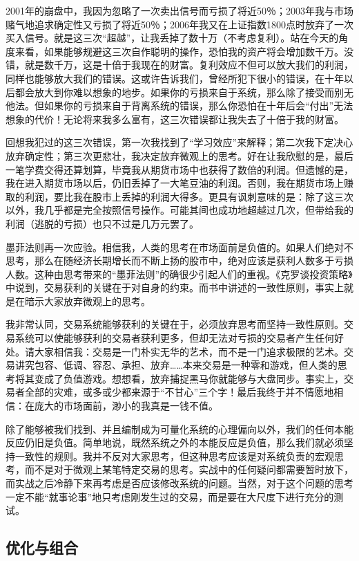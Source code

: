 2001年的崩盘中，我因为忽略了一次卖出信号而亏损了将近50％；2003年我与市场赌气地追求确定性又亏损了将近50％；2006年我又在上证指数1800点时放弃了一次买入信号。就是这三次“超越”，让我丢掉了数十万（不考虑复利）。站在今天的角度来看，如果能够规避这三次自作聪明的操作，恐怕我的资产将会增加数千万。没错，就是数千万，这是十倍于我现在的财富。复利效应不但可以放大我们的利润，同样也能够放大我们的错误。这或许告诉我们，曾经所犯下很小的错误，在十年以后都会放大到你难以想象的地步。如果你的亏损来自于系统，那么除了接受而别无他法。但如果你的亏损来自于背离系统的错误，那么你恐怕在十年后会“付出”无法想象的代价！无论将来我多么富有，这三次错误都让我失去了十倍于我的财富。

回想我犯过的这三次错误，第一次我找到了“学习效应”来解释；第二次我下定决心放弃确定性；第三次更悲壮，我决定放弃微观上的思考。好在让我欣慰的是，最后一笔学费交得还算划算，毕竟我从期货市场中也获得了数倍的利润。但遗憾的是，我在进入期货市场以后，仍旧丢掉了一大笔豆油的利润。否则，我在期货市场上赚取的利润，要比我在股市上丢掉的利润大得多。更具有讽刺意味的是：除了这三次以外，我几乎都是完全按照信号操作。可能其间也成功地超越过几次，但带给我的利润（逃脱的亏损）也只不过是几万元罢了。

墨菲法则再一次应验。相信我，人类的思考在市场面前是负值的。如果人们绝对不思考，那么在随经济长期增长而不断上扬的股市中，绝对应该是获利人数多于亏损人数。这种由思考带来的“墨菲法则”的确很少引起人们的重视。《克罗谈投资策略》中说到，交易获利的关键在于对自身的约束。而书中讲述的一致性原则，事实上就是在暗示大家放弃微观上的思考。

我非常认同，交易系统能够获利的关键在于，必须放弃思考而坚持一致性原则。交易系统可以使能够获利的交易者获利更多，但却无法对亏损的交易者产生任何好处。请大家相信我：交易是一门朴实无华的艺术，而不是一门追求极限的艺术。交易讲究包容、低调、容忍、承担、放弃……本来交易是一种零和游戏，但人类的思考将其变成了负值游戏。想想看，放弃捕捉黑马你就能够与大盘同步。事实上，交易者全部的灾难，或多或少都来源于“不甘心”三个字！最后我终于并不情愿地相信：在庞大的市场面前，渺小的我真是一钱不值。

除了能够被我们找到、并且编制成为可量化系统的心理偏向以外，我们的任何本能反应仍旧是负值。简单地说，既然系统之外的本能反应是负值，那么我们就必须坚持一致性的规则。我并不反对大家思考，但这种思考应该是对系统负责的宏观思考，而不是对于微观上某笔特定交易的思考。实战中的任何疑问都需要暂时放下，而实战之后冷静下来再考虑是否应该修改系统的问题。当然，对于这个问题的思考一定不能“就事论事”地只考虑刚发生过的交易，而是要在大尺度下进行充分的测试。

\subsection{优化与组合}

